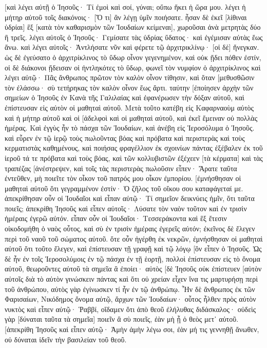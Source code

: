 [καὶ λέγει αὐτῇ ὁ Ἰησοῦς· Τί ἐμοὶ καὶ σοί, γύναι; οὔπω ἥκει ἡ ὥρα μου. 
λέγει ἡ μήτηρ αὐτοῦ τοῖς διακόνοις· [Ὅ τι] ἂν λέγῃ ὑμῖν ποιήσατε. 
ἦσαν δὲ ἐκεῖ [λίθιναι ὑδρίαι] ἓξ [κατὰ τὸν καθαρισμὸν τῶν Ἰουδαίων κείμεναι], χωροῦσαι ἀνὰ μετρητὰς δύο ἢ τρεῖς. 
λέγει αὐτοῖς ὁ Ἰησοῦς· Γεμίσατε τὰς ὑδρίας ὕδατος· καὶ ἐγέμισαν αὐτὰς ἕως ἄνω. 
καὶ λέγει αὐτοῖς· Ἀντλήσατε νῦν καὶ φέρετε τῷ ἀρχιτρικλίνῳ· [οἱ δὲ] ἤνεγκαν. 
ὡς δὲ ἐγεύσατο ὁ ἀρχιτρίκλινος τὸ ὕδωρ οἶνον γεγενημένον, καὶ οὐκ ᾔδει πόθεν ἐστίν, οἱ δὲ διάκονοι ᾔδεισαν οἱ ἠντληκότες τὸ ὕδωρ, φωνεῖ τὸν νυμφίον ὁ ἀρχιτρίκλινος 
καὶ λέγει αὐτῷ· Πᾶς ἄνθρωπος πρῶτον τὸν καλὸν οἶνον τίθησιν, καὶ ὅταν [μεθυσθῶσιν τὸν ἐλάσσω· σὺ τετήρηκας τὸν καλὸν οἶνον ἕως ἄρτι. 
ταύτην [ἐποίησεν ἀρχὴν τῶν σημείων ὁ Ἰησοῦς ἐν Κανὰ τῆς Γαλιλαίας καὶ ἐφανέρωσεν τὴν δόξαν αὐτοῦ, καὶ ἐπίστευσαν εἰς αὐτὸν οἱ μαθηταὶ αὐτοῦ. 
Μετὰ τοῦτο κατέβη εἰς Καφαρναοὺμ αὐτὸς καὶ ἡ μήτηρ αὐτοῦ καὶ οἱ [ἀδελφοὶ καὶ οἱ μαθηταὶ αὐτοῦ, καὶ ἐκεῖ ἔμειναν οὐ πολλὰς ἡμέρας. 
Καὶ ἐγγὺς ἦν τὸ πάσχα τῶν Ἰουδαίων, καὶ ἀνέβη εἰς Ἱεροσόλυμα ὁ Ἰησοῦς. 
καὶ εὗρεν ἐν τῷ ἱερῷ τοὺς πωλοῦντας βόας καὶ πρόβατα καὶ περιστερὰς καὶ τοὺς κερματιστὰς καθημένους, 
καὶ ποιήσας φραγέλλιον ἐκ σχοινίων πάντας ἐξέβαλεν ἐκ τοῦ ἱεροῦ τά τε πρόβατα καὶ τοὺς βόας, καὶ τῶν κολλυβιστῶν ἐξέχεεν [τὰ κέρματα] καὶ τὰς τραπέζας [ἀνέστρεψεν, 
καὶ τοῖς τὰς περιστερὰς πωλοῦσιν εἶπεν· Ἄρατε ταῦτα ἐντεῦθεν, μὴ ποιεῖτε τὸν οἶκον τοῦ πατρός μου οἶκον ἐμπορίου. 
[ἐμνήσθησαν οἱ μαθηταὶ αὐτοῦ ὅτι γεγραμμένον ἐστίν· Ὁ ζῆλος τοῦ οἴκου σου καταφάγεταί με. 
ἀπεκρίθησαν οὖν οἱ Ἰουδαῖοι καὶ εἶπαν αὐτῷ· Τί σημεῖον δεικνύεις ἡμῖν, ὅτι ταῦτα ποιεῖς; 
ἀπεκρίθη Ἰησοῦς καὶ εἶπεν αὐτοῖς· Λύσατε τὸν ναὸν τοῦτον καὶ ἐν τρισὶν ἡμέραις ἐγερῶ αὐτόν. 
εἶπαν οὖν οἱ Ἰουδαῖοι· Τεσσεράκοντα καὶ ἓξ ἔτεσιν οἰκοδομήθη ὁ ναὸς οὗτος, καὶ σὺ ἐν τρισὶν ἡμέραις ἐγερεῖς αὐτόν; 
ἐκεῖνος δὲ ἔλεγεν περὶ τοῦ ναοῦ τοῦ σώματος αὐτοῦ. 
ὅτε οὖν ἠγέρθη ἐκ νεκρῶν, ἐμνήσθησαν οἱ μαθηταὶ αὐτοῦ ὅτι τοῦτο ἔλεγεν, καὶ ἐπίστευσαν τῇ γραφῇ καὶ τῷ λόγῳ [ὃν εἶπεν ὁ Ἰησοῦς. 
Ὡς δὲ ἦν ἐν τοῖς Ἱεροσολύμοις ἐν τῷ πάσχα ἐν τῇ ἑορτῇ, πολλοὶ ἐπίστευσαν εἰς τὸ ὄνομα αὐτοῦ, θεωροῦντες αὐτοῦ τὰ σημεῖα ἃ ἐποίει· 
αὐτὸς [δὲ Ἰησοῦς οὐκ ἐπίστευεν [αὑτὸν αὐτοῖς διὰ τὸ αὐτὸν γινώσκειν πάντας 
καὶ ὅτι οὐ χρείαν εἶχεν ἵνα τις μαρτυρήσῃ περὶ τοῦ ἀνθρώπου, αὐτὸς γὰρ ἐγίνωσκεν τί ἦν ἐν τῷ ἀνθρώπῳ. 
Ἦν δὲ ἄνθρωπος ἐκ τῶν Φαρισαίων, Νικόδημος ὄνομα αὐτῷ, ἄρχων τῶν Ἰουδαίων· 
οὗτος ἦλθεν πρὸς αὐτὸν νυκτὸς καὶ εἶπεν αὐτῷ· Ῥαββί, οἴδαμεν ὅτι ἀπὸ θεοῦ ἐλήλυθας διδάσκαλος· οὐδεὶς γὰρ [δύναται ταῦτα τὰ σημεῖα] ποιεῖν ἃ σὺ ποιεῖς, ἐὰν μὴ ᾖ ὁ θεὸς μετ᾽ αὐτοῦ. 
[ἀπεκρίθη Ἰησοῦς καὶ εἶπεν αὐτῷ· Ἀμὴν ἀμὴν λέγω σοι, ἐὰν μή τις γεννηθῇ ἄνωθεν, οὐ δύναται ἰδεῖν τὴν βασιλείαν τοῦ θεοῦ. 
